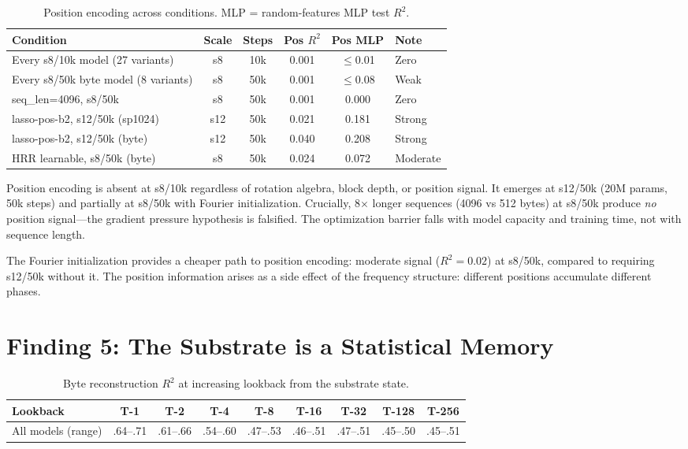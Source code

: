 \documentclass[11pt,a4paper]{article}
\begin{document}
\begin{table}[h]
\centering
\caption{Position encoding across conditions. MLP = random-features MLP test $R^2$.}
\begin{tabular}{lccccl}
\toprule
Condition & Scale & Steps & Pos $R^2$ & Pos MLP & Note \\
\midrule
Every s8/10k model (27 variants) & s8 & 10k & 0.001 & $\leq$0.01 & Zero \\
Every s8/50k byte model (8 variants) & s8 & 50k & 0.001 & $\leq$0.08 & Weak \\
seq\_len=4096, s8/50k & s8 & 50k & 0.001 & 0.000 & Zero \\
lasso-pos-b2, s12/50k (sp1024) & s12 & 50k & 0.021 & 0.181 & Strong \\
lasso-pos-b2, s12/50k (byte) & s12 & 50k & 0.040 & 0.208 & Strong \\
HRR learnable, s8/50k (byte) & s8 & 50k & 0.024 & 0.072 & Moderate \\
\bottomrule
\end{tabular}
\end{table}

Position encoding is absent at s8/10k regardless of rotation algebra, block depth, or position signal. It emerges at s12/50k (20M params, 50k steps) and partially at s8/50k with Fourier initialization. Crucially, 8$\times$ longer sequences (4096 vs 512 bytes) at s8/50k produce \emph{no} position signal---the gradient pressure hypothesis is falsified. The optimization barrier falls with model capacity and training time, not with sequence length.

The Fourier initialization provides a cheaper path to position encoding: moderate signal ($R^2 = 0.02$) at s8/50k, compared to requiring s12/50k without it. The position information arises as a side effect of the frequency structure: different positions accumulate different phases.

\section{Finding 5: The Substrate is a Statistical Memory}

\begin{table}[h]
\centering
\caption{Byte reconstruction $R^2$ at increasing lookback from the substrate state.}
\begin{tabular}{lcccccccc}
\toprule
Lookback & T-1 & T-2 & T-4 & T-8 & T-16 & T-32 & T-128 & T-256 \\
\midrule
All models (range) & .64--.71 & .61--.66 & .54--.60 & .47--.53 & .46--.51 & .47--.51 & .45--.50 & .45--.51 \\
\bottomrule
\end{tabular}
\end{table}
\end{document}
